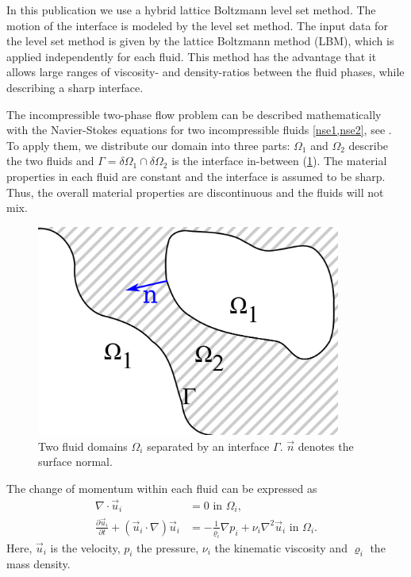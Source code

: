 \documentclass[final,leqno,onefignum,onetabnum]{siamltexmm}
\begin{document}
In this publication we use a hybrid lattice Boltzmann level set method. The motion of the interface is modeled by the level set method. The input data for the level set method is given by the lattice Boltzmann method (LBM), which is applied independently for each fluid. This method has the advantage that it allows large ranges of viscosity- and density-ratios between the fluid phases, while describing a sharp interface.

The incompressible two-phase flow problem can be described mathematically with the Navier-Stokes equations for two incompressible fluids \cref{nse1,nse2}, see \cite{ferziger}. To apply them, we distribute our domain into three parts: $\Omega_1$ and $\Omega_2$ describe the two fluids and $\Gamma = \delta\Omega_1 \cap \delta\Omega_2$ is the interface in-between (\cref{intro_phases}). The material properties in each fluid are constant and the interface is assumed to be sharp. Thus, the overall material properties are discontinuous and the fluids will not mix.
\begin{figure}[h!]
  \vspace{-2cm}
  \centering
  \hspace{2cm}\includegraphics[width=10cm,natwidth=1690,natheight=1174]{skizze.png}
	\caption{Two fluid domains $\Omega_i$ separated by an interface $\Gamma$. $\vec n$ denotes the surface normal.}
	\label{intro_phases}
\end{figure}

\vspace{1cm}
The change of momentum within each fluid can be expressed as
\begin{align}
  \nabla \cdot  \vec u_i &= 0 \text{  in } \Omega_i \text{,}
	\label{nse1} \\
	\frac{\partial \vec u_i}{\partial t} + \left(\vec  u_i\cdot \nabla \right) \vec u_i
  &=
	-\frac{1}{\varrho_i}\nabla p_i + \nu_i \nabla^2 \vec u_i \text{  in } \Omega_i \text{.}
	\label{nse2}
\end{align}
Here, $\vec u_i$ is the velocity, $p_i$ the pressure, $\nu_i$ the kinematic viscosity and $\varrho_i$ the mass density.
\end{document}
